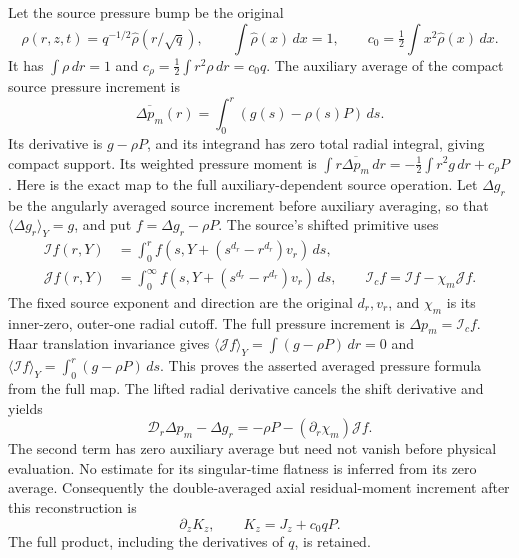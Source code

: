 \documentclass[11pt]{article}
\begin{document}
Let the source pressure bump be the original
\[
 \rho(r,z,t)=q^{-1/2}\widehat\rho(r/\sqrt q),\qquad
 \int\widehat\rho(x)\,dx=1,\qquad
 c_0=\tfrac12\int x^2\widehat\rho(x)\,dx .
\]
It has \(\int\rho\,dr=1\) and
\(c_\rho=\frac12\int r^2\rho\,dr=c_0q\).
The auxiliary average of the compact source pressure increment is
\[
 \overline{\Delta p_m}(r)=\int_0^r(g(s)-\rho(s)P)\,ds .
\]
Its derivative is \(g-\rho P\), and its integrand has zero total
radial integral, giving compact support. Its weighted pressure moment is
\(\int r\overline{\Delta p_m}\,dr=-\frac12\int r^2g\,dr+c_\rho P\).
Here is the exact map to the full auxiliary-dependent source operation.
Let \(\Delta g_r\) be the angularly averaged source increment before
auxiliary averaging, so that \(\langle\Delta g_r\rangle_Y=g\), and
put \(f=\Delta g_r-\rho P\). The source's shifted primitive uses
\[
 \begin{split}
 \mathcal I f(r,Y)&=\int_0^r
       f(s,Y+(s^{d_r}-r^{d_r})v_r)\,ds,\\
 \mathcal J f(r,Y)&=\int_0^\infty
       f(s,Y+(s^{d_r}-r^{d_r})v_r)\,ds,\qquad
 \mathcal I_cf=\mathcal If-\chi_m\mathcal Jf .
 \end{split}
\]
The fixed source exponent and direction are the original \(d_r,v_r\),
and \(\chi_m\) is its inner-zero, outer-one radial cutoff. The full
pressure increment is \(\Delta p_m=\mathcal I_cf\).
Haar translation invariance gives
\(\langle\mathcal Jf\rangle_Y=\int(g-\rho P)\,dr=0\) and
\(\langle\mathcal If\rangle_Y=\int_0^r(g-\rho P)\,ds\).
This proves the asserted averaged pressure formula from the full map.
The lifted radial derivative cancels the shift derivative and yields
\[
 \mathcal D_r\Delta p_m-\Delta g_r
       =-\rho P-(\partial_r\chi_m)\mathcal Jf .
\]
The second term has zero auxiliary average but need not vanish before
physical evaluation. No estimate for its singular-time flatness is
inferred from its zero average.
Consequently the double-averaged axial residual-moment increment after
this reconstruction is
\[
 \partial_zK_z,\qquad K_z=J_z+c_0qP .
\]
The full product, including the derivatives of \(q\), is retained.
\end{document}
